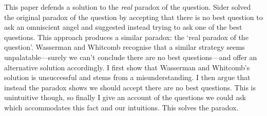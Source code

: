 This paper defends a solution to the \emph{real} paradox of the question.
Sider solved the original paradox of the question by accepting that there is no best question to ask an omniscient angel and suggested instead trying to ask one of the best questions.
This approach produces a similar paradox: the `real paradox of the question'.
Wasserman and Whitcomb recognise that a similar strategy seems unpalatable---surely we can't conclude there are no best questions---and offer an alternative solution accordingly.
I first show that Wasserman and Whitcomb's solution is unsuccessful and stems from a misunderstanding.
I then argue  that instead the paradox shows we should accept there are no best questions.
This is unintuitive though, so finally I give an account of the questions we could ask which accommodates this fact and our intuitions.
This solves the paradox.
